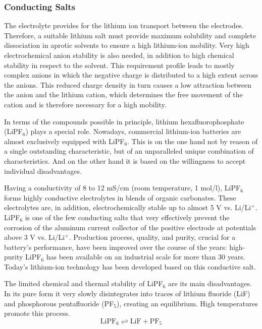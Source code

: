 \subsubsection{Conducting Salts}
\label{sec:conducting-salts}
The electrolyte provides for the lithium ion transport between the electrodes. Therefore, a suitable lithium salt must provide maximum solubility and complete dissociation in aprotic solvents to ensure a high lithium-ion mobility. Very high electrochemical anion stability is also needed, in addition to high chemical stability in respect to the solvent. This requirement profile leads to mostly complex anions in which the negative charge is distributed to a high extent across the anions. This reduced charge density in turn causes a low attraction between the anion and the lithium cation, which determines the free movement of the cation and is therefore necessary for a high mobility.

In terms of the compounds possible in principle, lithium hexafluorophosphate (LiPF$_6$) plays a special role. Nowadays, commercial lithium-ion batteries are almost exclusively equipped with LiPF$_6$. This is on the one hand not by reason of a single outstanding characteristic, but of an unparalleled unique combination of characteristics. And on the other hand it is based on the willingness to accept individual disadvantages.

Having a conductivity of 8 to 12 mS/cm (room temperature, 1 mol/l), LiPF$_6$ forms highly conductive electrolytes in blends of organic carbonates. These electrolytes are, in addition, electrochemically stable up to almost 5 V vs. Li/Li$^+$. LiPF$_6$ is one of the few conducting salts that very effectively prevent the corrosion of the aluminum current collector of the positive electrode at potentials above 3 V vs. Li/Li$^+$. Production process, quality, and purity, crucial for a battery's performance, have been improved over the course of the years: high-purity LiPF$_6$ has been available on an industrial scale for more than 30 years. Today's lithium-ion technology has been developed based on this conductive salt.

The limited chemical and thermal stability of LiPF$_6$ are its main disadvantages. In its pure form it very slowly disintegrates into traces of lithium fluoride (LiF) and phosphorous pentafluoride (PF$_5$), creating an equilibrium. High temperatures promote this process.
\begin{equation}
    \label{eq:lipf6-dissociation}
    \text{LiPF}_6 \rightleftharpoons \text{LiF} + \text{PF}_5
\end{equation}

